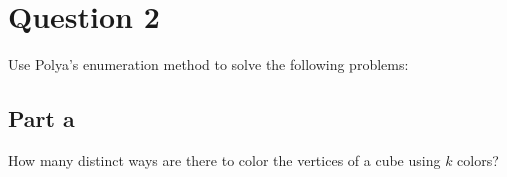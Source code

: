 \section{Question 2}

\begin{question}
    Use Polya's enumeration method to solve the following problems:
\end{question}

\subsection{Part a}

\begin{question}
    How many distinct ways are there to color the vertices of a cube using $k$ colors?
\end{question}


